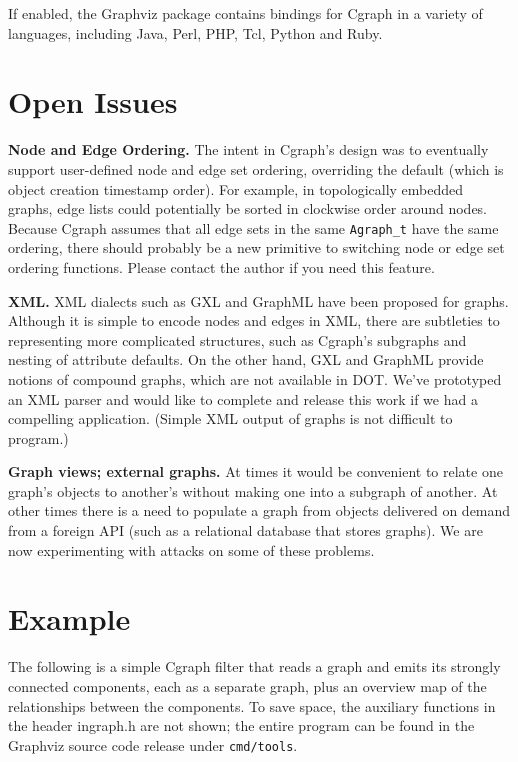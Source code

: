 \documentclass[11pt,letterpaper]{article}
\begin{document}
\begin{savenotes}
If enabled, the Graphviz package contains bindings for Cgraph in a variety
of languages, including Java, Perl, PHP, Tcl, Python and Ruby.

\section{Open Issues}
\label{sec:openissues}

{\bf Node and Edge Ordering.} The intent in Cgraph's design was to
eventually support user-defined node and edge set ordering, overriding
the default (which is object creation timestamp order).  For example,
in topologically embedded graphs, edge lists could potentially be sorted
in clockwise order around nodes.
Because Cgraph assumes that all edge sets in the same \verb"Agraph_t"
have the same ordering, there should probably be a new primitive to
switching node or edge set ordering functions.  Please contact the
author if you need this feature.

{\bf XML.}  XML dialects such as GXL and GraphML have been proposed
for graphs.  Although it is simple to encode nodes and edges in XML,
there are subtleties to representing more complicated structures, such as
Cgraph's subgraphs and nesting of attribute defaults.
On the other hand, GXL and GraphML provide notions of compound graphs,
which are not available in DOT.
We've prototyped an XML parser and would like to complete and release
this work if we had a compelling application.  (Simple XML output of
graphs is not difficult to program.)

{\bf Graph views; external graphs.}  At times it would be convenient
to relate one graph's objects to another's without making one into a
subgraph of another.  At other times there is a need to populate
a graph from objects delivered on demand from a foreign API (such as a
relational database that stores graphs).  We are now experimenting with
attacks on some of these problems.


\end{savenotes}
\section{Example}
\label{sec:example}

The following is a simple Cgraph filter that reads a graph and
emits its strongly connected components, each as a separate graph,
plus an overview map of the relationships between the components.
To save space, the auxiliary functions in the header ingraph.h
are not shown; the entire program can be found in the Graphviz
source code release under \verb"cmd/tools".
\end{document}
